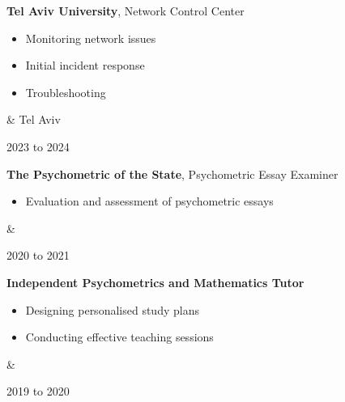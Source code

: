 \documentclass[10pt, letterpaper]{article}
\newenvironment{highlights}{
        \begin{itemize}[
                topsep=0pt,
                parsep=0.10 cm,
                partopsep=0pt,
                itemsep=0pt,
                after=\vspace{-1\baselineskip},
                leftmargin=0.4 cm + 3pt
            ]
    }{
        \end{itemize}
    } %
\let\originalTabularx\tabularx
\let\originalEndTabularx\endtabularx
\renewenvironment{tabularx}{\bgroup\centering\originalTabularx}{\originalEndTabularx\par\egroup}
\begin{document}
        \vspace{0.2 cm}
        \begin{tabularx}{
            \textwidth-0.4 cm-0.13cm
        }{
            K{0.2 cm}
            R{4.1 cm}
        }
            
            \textbf{Tel Aviv University}, Network Control Center

            \vspace{0.10 cm}

            \begin{highlights}
                \item Monitoring network issues
                \item Initial incident response
                \item Troubleshooting
            \end{highlights}
            &
            Tel Aviv

            2023 to 2024
        \end{tabularx}

        \vspace{0.2 cm}
        \begin{tabularx}{
            \textwidth-0.4 cm-0.13cm
        }{
            K{0.2 cm}
            R{4.1 cm}
        }
            
            \textbf{The Psychometric of the State}, Psychometric Essay Examiner

            \vspace{0.10 cm}

            \begin{highlights}
                \item Evaluation and assessment of psychometric essays
            \end{highlights}
            &
            

            
            2020 to 2021
        \end{tabularx}

        \vspace{0.2 cm}
        \begin{tabularx}{
            \textwidth-0.4 cm-0.13cm
        }{
            K{0.2 cm}
            R{4.1 cm}
        }
            
            \textbf{Independent Psychometrics and Mathematics Tutor}

            \vspace{0.10 cm}

            \begin{highlights}
                \item Designing personalised study plans
                \item Conducting effective teaching sessions
            \end{highlights}
            &
            

            
            2019 to 2020
        \end{tabularx}
\end{document}
